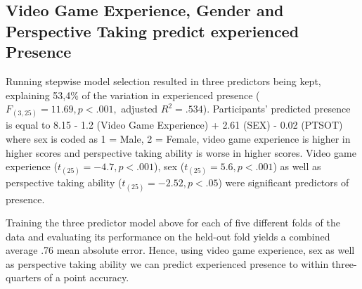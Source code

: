 \subsection{Video Game Experience, Gender and Perspective Taking predict experienced Presence} Running stepwise model selection resulted in three predictors being kept, explaining 53,4\% of the variation in experienced presence ($F_{(3,25)}=11.69, p < .001,$ adjusted $R^2=.534$). Participants' predicted presence is equal to 8.15 - 1.2 (Video Game Experience) + 2.61 (SEX) - 0.02 (PTSOT) where sex is coded as 1 = Male, 2 = Female, video game experience is higher in higher scores and perspective taking ability is worse in higher scores. Video game experience ($t_{(25)}=-4.7, p<.001$), sex ($t_{(25)}=5.6, p<.001$) as well as perspective taking ability ($t_{(25)}=-2.52, p<.05$) were significant predictors of presence.

Training the three predictor model above for each of five different folds of the data and evaluating its performance on the held-out fold yields a combined average .76 mean absolute error. Hence, using video game experience, sex as well as perspective taking ability we can predict experienced presence to within three-quarters of a point accuracy.